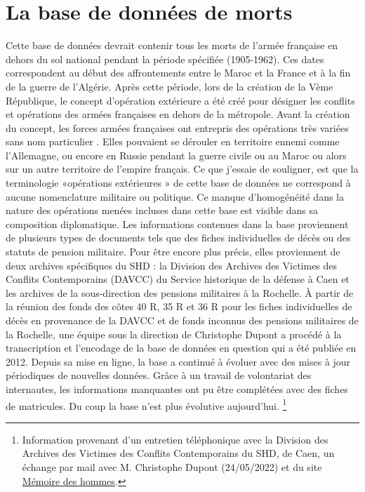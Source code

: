 \section{La base de données de morts}
Cette base de données devrait contenir tous les morts de l’armée française en dehors du sol national pendant la période spécifiée (1905-1962). Ces dates correspondent au début des affrontements entre le Maroc et la France et à la fin de la guerre de l’Algérie. Après cette période, lors de la création de la Vème République, le concept d'opération extérieure a été  créé pour désigner les conflits et opérations des armées françaises en dehors de la métropole. Avant la création du concept, les forces armées françaises ont entrepris des opérations très  variées sans nom particulier . Elles pouvaient se dérouler  en territoire ennemi comme l’Allemagne, ou encore en Russie pendant la guerre civile ou au Maroc ou alors sur un autre territoire de l’empire français. Ce que j’essaie de souligner, est que la terminologie «opérations extérieures » de cette base de données ne correspond à aucune nomenclature militaire ou politique. Ce manque d'homogénéité dans la nature  des opérations menées incluses dans cette base est visible dans sa composition diplomatique. Les informations contenues dans la base proviennent de plusieurs types de documents tels que des fiches individuelles de décès ou des statuts de pension militaire. Pour être encore plus précis, elles proviennent de deux archives spécifiques du SHD : la Division des Archives des Victimes des Conflits Contemporains (DAVCC) du Service historique de la défense à Caen et les archives de la sous-direction des pensions militaires à la Rochelle. À partir de la réunion des fonds des côtes 40 R, 35 R et 36 R pour les fiches individuelles de décès en provenance de la DAVCC et de fonds inconnus des pensions militaires de la Rochelle, une équipe sous la direction de Christophe Dupont a procédé à la transcription et l’encodage de la base de données en question qui a été publiée en 2012. Depuis sa mise en ligne, la base a continué à évoluer avec des mises à jour périodiques de nouvelles données. Grâce à un travail de volontariat des internautes, les informations manquantes ont pu être complétées avec des fiches de matricules. Du coup la base n’est plus évolutive aujourd’hui. \footnote{Information provenant d’un entretien téléphonique avec la  Division des Archives des Victimes des Conflits Contemporains du SHD, de Caen, un échange par mail avec M. Christophe Dupont (24/05/2022) et du site \href{https://www.memoiredeshommes.sga.defense.gouv.fr/fr/article.php?laref=69&titre=aide-a-la-recherche}{\underline{Mémoire des hommes}}. }\\

